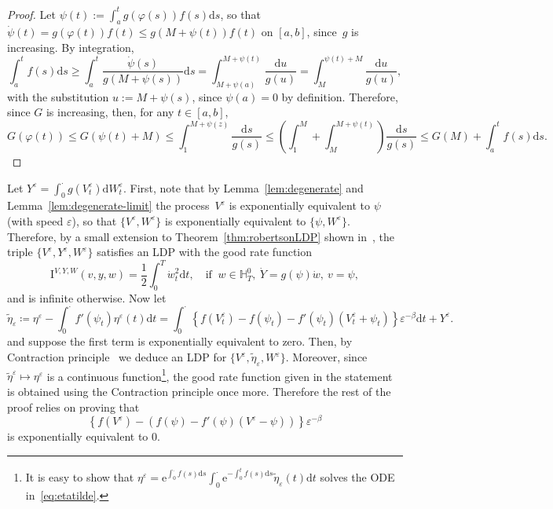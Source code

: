 \documentclass{amsart}[11pt]
\numberwithin{equation}{section}
\numberwithin{theorem}{subsection}
\numberwithin{proposition}{subsection}
\numberwithin{definition}{subsection}
\numberwithin{lemma}{subsection}
\numberwithin{assumption}{subsection}
\newcommand{\HH}{\mathbb{H}}
\newcommand{\D}{\mathrm{d}}
\newcommand{\E}{\mathrm{e}}
\newcommand{\II}{\mathrm{I}}
\newcommand{\eps}{\varepsilon}
\begin{document}
\begin{proof}
Let $\psi(t) := \int_a^{t} g(\varphi(s))f(s)\D s$, so that
$\dot{\psi}(t) = g(\varphi(t))f(t) \leq g(M+\psi(t)) f(t)$ on $[a,b]$,
since~$g$ is increasing. By integration,
$$
\int_a^tf(s)\D s \geq \int_a^t \frac{\dot{\psi}(s)}{g(M+\psi(s))}\D s 
= \int_{M+\psi(a)}^{M+\psi(t)}\frac{\D u}{g(u)}
=  \int_{M}^{\psi(t)+M}\frac{\D u}{g(u)},
$$
with the substitution $u:=M+\psi(s)$, since $\psi(a)=0$ by definition.
Therefore, since $G$ is increasing, then, for any $t\in[a,b]$,
$$
G(\varphi(t)) \leq G(\psi(t) + M) 
\leq \int_1^{M +\psi(z)}\frac{\D s}{g(s)}
\leq \left(\int_{1}^{M}+ \int_{M}^{M+\psi(t)}\right)\frac{\D s}{g(s)}
\leq G(M) + \int_a^t f(s)\D s.
$$
\end{proof}
Let $Y^\eps=\int_{0}^{\cdot} g(V^\eps_t)\D W_t^\eps$.
First, note that by Lemma~\ref{lem:degenerate} and Lemma~\ref{lem:degenerate-limit} the process~$V^\eps$ is exponentially equivalent to $\psi$ (with speed $\eps$),
so that $\{V^\eps,W^\eps\}$ is exponentially equivalent to $\{\psi,W^\eps\}$. 
Therefore, by a small extension to Theorem~\ref{thm:robertsonLDP} shown in~\cite[Lemma 3.1]{Robertson2010}, the triple $\{V^\eps,Y^\eps,W^\eps\}$ satisfies an LDP with the good rate function
$$
\II^{V,Y,W}(v,y,w) = 
\frac{1}{2}\int_0^T\dot{w}_t^2\D t,\quad \text{if }\ w \in \HH_T^0,\  \dot{Y} = g(\psi)\dot{w}, \ v = \psi,
$$
and is infinite otherwise. Now let 
\begin{equation}\label{eq:etatilde}
\widetilde{\eta}_\eps \coloneqq \eta^{\eps} - \int_{0}^{\cdot} f'(\psi_t)\eta^\eps(t) \D t = \int_{0}^{\cdot} \left\{f(V^\eps_t) - f(\psi_t) - f'(\psi_t)(V^\eps_t + \psi_t)\right\}\eps^{-\beta}\D t + Y^\eps.
\end{equation}
and suppose the first term is exponentially equivalent to zero. 
Then, by Contraction principle~\cite[Theorem 4.2.1]{Dembo2010} 
we deduce an LDP for $\{V^\eps, \widetilde{\eta}_\eps, W^\eps\}$. Moreover, since $\widetilde{\eta}^\eps \mapsto \eta^\eps$ is a continuous function\footnote{It is easy to show that $\eta^{\eps} =\E^{\int_{0}^{\cdot} f(s)\D s}\int_{0}^{\cdot} \E^{-\int_0^t f(s)\D s}\widetilde{\eta}_\eps(t) \D t $ solves the ODE in~\eqref{eq:etatilde}.}, the good rate function given in the statement is obtained using the Contraction principle once more. 
Therefore the rest of the proof relies on proving that 
\[
\left\{f(V^\eps) - \left(f(\psi) - f'(\psi)(V^\eps -\psi)\right)\right\}\eps^{-\beta}
\]
is exponentially equivalent to $0$. %
\end{document}
